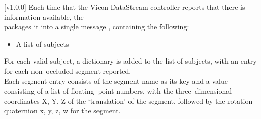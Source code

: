 [v1.0.0]
Each time that the Vicon DataStream controller reports that there is information
available, the\\
 packages it into a single message
\openSq{}\closeSq, containing the following:
\begin{itemize}
\item A list of subjects
\end{itemize}

For each valid subject, a dictionary \openSq{}\closeSq{} is added to the
list of subjects, with an entry for each non--occluded segment reported.\\

Each segment entry consists of the segment name as its key and a value consisting of a
list of floating--point numbers, with the three--dimensional coordinates \openSq{}X, Y,
Z\closeSq{} of the `translation' of the segment, followed by the rotation quaternion
\openSq{}x, y, z, w\closeSq{} for the segment.
\primaryEnd{}
